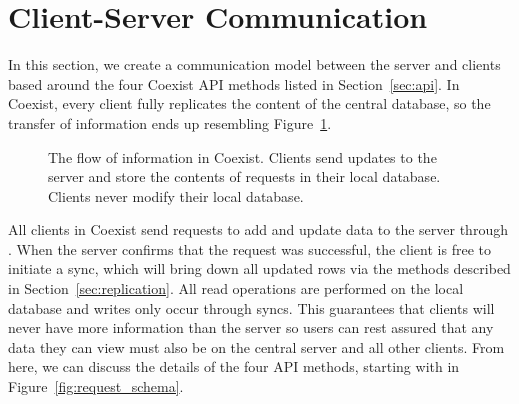 \section{Client-Server Communication} \label{sec:communication}

In this section, we create a communication model between the server and clients
based around the four Coexist API methods listed in Section~\ref{sec:api}. In
Coexist, every client fully replicates the content of the central database, so
the transfer of information ends up resembling Figure~\ref{fig:mirror}.


\begin{figure}[h!]
\centering
{}
\caption{The flow of information in Coexist. Clients send updates to the server
and store the contents of requests in their local database. Clients never modify
their local database.}
\label{fig:mirror}
\end{figure}

All clients in Coexist send requests to add and update data to the server
through \create. When the server confirms that the request was successful, the
client is free to initiate a sync, which will bring down all updated rows via
the methods described in Section~\ref{sec:replication}. All read operations are
performed on the local database and writes only occur through syncs. This
guarantees that clients will never have more information than the server so
users can rest assured that any data they can view must also be on the central
server and all other clients. From here, we can discuss the details of the four
API methods, starting with \schema in Figure~\ref{fig:request_schema}. 


